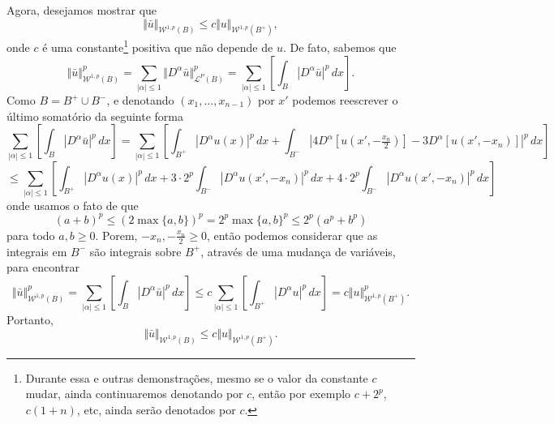 \documentclass[a4paper, 11pt]{book}
\theoremstyle{definition}
\newcommand{\cL}{\mathcal{L}}
\newcommand{\cW}{\mathcal{W}}
\begin{document}
\begin{prf}
    Agora, desejamos mostrar que 
    \begin{equation} \label{eq:desigualdade-B-Bmais}
        \Vert \bar u \Vert_{\cW^{1,p}(B)} \leqslant c \Vert u \Vert_{\cW^{1,p}(B^+)},
    \end{equation}
    onde $c$ é uma constante\footnote{Durante essa e outras demonstrações, mesmo se o valor da constante $c$ mudar, ainda continuaremos denotando por $c$, então por exemplo $c + 2^p$, $c(1 + n)$, etc, ainda serão denotados por $c$.} positiva que não depende de $u$.
    De fato, sabemos que
    \[
        \Vert \bar u \Vert_{\cW^{1,p}(B)}^p = \sum_{|\alpha| \leqslant 1} \Vert D^\alpha\bar u \Vert_{\cL^P(B)}^p = \sum_{|\alpha| \leqslant 1} \left[\int_B |D^\alpha \bar u| ^p \,dx\right].
    \]
    Como $B = B^+ \cup B^-$, e denotando $(x_1,\dots,x_{n-1})$ por $x'$ podemos reescrever o último somatório da seguinte forma
    \[
        \sum_{|\alpha| \leqslant 1} \left[\int_B |D^\alpha \bar u| ^p \,dx\right] = \sum_{|\alpha| \leqslant 1} \left[ \int_{B^+} |D^\alpha u(x)|^p \,dx + \int_{B^-} |4D^\alpha [u(x',-\tfrac{x_n}{2})] - 3D^\alpha [u(x',-x_n)] |^p \,dx \right]
    \]
    \[
        \leqslant \sum_{|\alpha| \leqslant 1} \left[ \int_{B^+} |D^\alpha u(x)|^p \,dx + 3 \cdot 2^p\int_{B^-} |D^\alpha u(x',-x_n)|^p \,dx + 4 \cdot 2^p\int_{B^-} |D^\alpha u(x',-x_n)|^p \,dx   \right] 
    \]
    onde usamos o fato de que
    \[
        (a + b)^p \leqslant (2 \max\{a,b\})^p = 2^p \max\{a,b\}^p \leqslant 2^p (a^p + b^p)
    \]
    para todo $a,b \geqslant 0$. Porem, $-x_n, -\tfrac{x_n}{2} \geqslant 0$, então podemos considerar que as integrais em $B^-$ são integrais sobre $B^+$, através de uma mudança de variáveis, para encontrar
    \[
        \Vert \bar u \Vert_{\cW^{1,p}(B)}^p = \sum_{|\alpha| \leqslant 1} \left[\int_B |D^\alpha \bar u| ^p \,dx\right] \leqslant c\sum_{|\alpha| \leqslant 1} \left[ \int_{B^+}|D^\alpha u|^p \,dx \right] = c \Vert u \Vert_{\cW^{1,p}(B^+)}^p.
    \]
    Portanto,
    \[
        \Vert \bar u \Vert_{\cW^{1,p}(B)} \leqslant c \Vert u \Vert_{\cW^{1,p}(B^+)}.
    \]


\end{prf}
\end{document}
